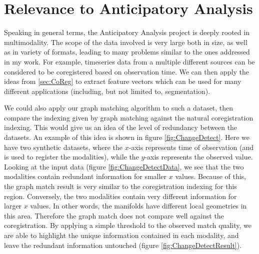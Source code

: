 \documentclass[journal]{IEEEtran}
\begin{document}

\section{Relevance to Anticipatory Analysis}
\label{sec:relevance}

Speaking in general terms, the Anticipatory Analysis project is deeply rooted in
multimodality. The scope of the data involved is very large both in size, as
well as in variety of formats, leading to many problems similar to the ones
addressed in my work. For example, timeseries data from a multiple different
sources can be considered to be coregistered based on observation time. We can
then apply the ideas from \ref{sec:CoReg} to extract feature vectors which can
be used for many different applications (including, but not limited to,
segmentation).

We could also apply our graph matching algorithm to such a dataset, then compare
the indexing given by graph matching against the natural coregistration
indexing. This would give us an idea of the level of redundancy between the
datasets. An example of this idea is shown in figure \ref{fig:ChangeDetect}.
Here we have two synthetic datasets, where the $x$-axis represents time of
observation (and is used to register the modalities), while the $y$-axis
represents the observed value. Looking at the input data (figure
\ref{fig:ChangeDetectData}, we see that the two modalities contain redundant
information for smaller $x$ values. Because of this, the graph match result is
very similar to the coregistration indexing for this region. Conversely,
the two modalities contain very different information for larger $x$ values. In
other words, the manifolds have different local geometries in this
area. Therefore the graph match does not compare well against the
coregistration. By applying a simple threshold to the observed match quality, we
are able to highlight the unique information contained in each modality, and
leave the redundant information untouched (figure \ref{fig:ChangeDetectResult}).
\end{document}
